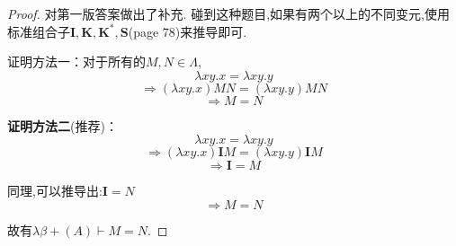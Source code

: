 
\begin{proof}{\color {red} {对第一版答案做出了补充.}}
碰到这种题目,如果有两个以上的不同变元,使用标准组合子$\mathbf{I}, \mathbf{K}, \mathbf{K^*}, \mathbf{S}$(page 78)来推导即可.

证明方法一：对于所有的$M,N\in\Lambda$,
$$ \lambda xy.x=\lambda xy.y $$
$$ \Rightarrow (\lambda xy.x)MN=(\lambda xy.y)MN $$
$$ \Rightarrow M=N $$

\textbf{证明方法二}(推荐)：
$$ \lambda xy.x=\lambda xy.y $$
$$ \Rightarrow (\lambda xy.x)\mathbf{I}M=(\lambda xy.y)\mathbf{I}M $$
$$ \Rightarrow \mathbf{I}=M $$

同理,可以推导出:\qquad \qquad \qquad \qquad \quad $ \mathbf{I}=N $
$$ \Rightarrow M=N $$

故有$\lambda\beta+(A)\vdash M=N$.

\end{proof}